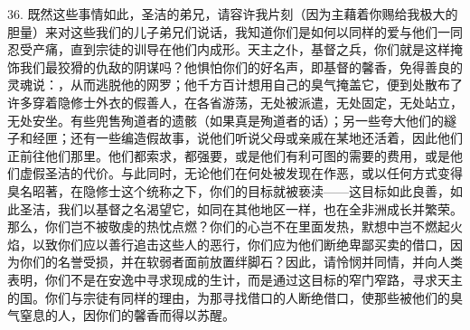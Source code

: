 36. 既然这些事情如此，圣洁的弟兄，请容许我片刻（因为主藉着你赐给我极大的胆量）来对这些我们的儿子弟兄们说话，我知道你们是如何以同样的爱与他们一同忍受产痛，直到宗徒的训导在他们内成形。天主之仆，基督之兵，你们就是这样掩饰我们最狡猾的仇敌的阴谋吗？他惧怕你们的好名声，即基督的馨香，免得善良的灵魂说：，从而逃脱他的网罗；他千方百计想用自己的臭气掩盖它，便到处散布了许多穿着隐修士外衣的假善人，在各省游荡，无处被派遣，无处固定，无处站立，无处安坐。有些兜售殉道者的遗骸（如果真是殉道者的话）；另一些夸大他们的繸子和经匣；还有一些编造假故事，说他们听说父母或亲戚在某地还活着，因此他们正前往他们那里。他们都索求，都强要，或是他们有利可图的需要的费用，或是他们虚假圣洁的代价。与此同时，无论他们在何处被发现在作恶，或以任何方式变得臭名昭著，在隐修士这个统称之下，你们的目标就被亵渎——这目标如此良善，如此圣洁，我们以基督之名渴望它，如同在其他地区一样，也在全非洲成长并繁荣。那么，你们岂不被敬虔的热忱点燃？你们的心岂不在里面发热，默想中岂不燃起火焰，以致你们应以善行追击这些人的恶行，你们应为他们断绝卑鄙买卖的借口，因为你们的名誉受损，并在软弱者面前放置绊脚石？因此，请怜悯并同情，并向人类表明，你们不是在安逸中寻求现成的生计，而是通过这目标的窄门窄路，寻求天主的国。你们与宗徒有同样的理由，为那寻找借口的人断绝借口，使那些被他们的臭气窒息的人，因你们的馨香而得以苏醒。\par

